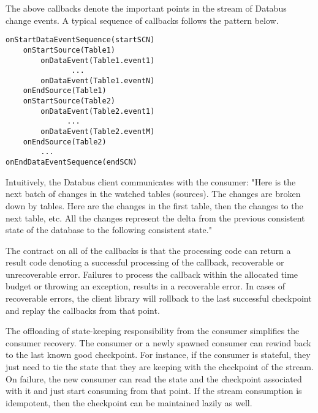 The above callbacks denote the important points in the stream of Databus change events. A typical sequence of callbacks follows the pattern below.

\begin{verbatim}
onStartDataEventSequence(startSCN)
    onStartSource(Table1)
        onDataEvent(Table1.event1)
               ...
        onDataEvent(Table1.eventN) 
    onEndSource(Table1)
    onStartSource(Table2)
        onDataEvent(Table2.event1) 
              ...
        onDataEvent(Table2.eventM)
    onEndSource(Table2)
        ... 
onEndDataEventSequence(endSCN)
\end{verbatim}

Intuitively, the Databus client communicates with the consumer: "Here is the next batch of changes in the watched tables (sources). The changes are broken down by tables. Here are the changes in the first table, then the changes to the next table, etc. All the changes represent the delta from the previous consistent state of the database to the following consistent state."

The contract on all of the callbacks is that the processing code can return a result code denoting a successful processing of the callback, recoverable or unrecoverable error. Failures to process the callback within the allocated time budget or throwing an exception, results in a recoverable error.
In cases of recoverable errors, the client library will rollback to the last successful checkpoint and replay the callbacks from that point.

The offloading of state-keeping responsibility from the consumer simplifies the consumer recovery. The consumer or a newly spawned consumer can rewind back to the last known good checkpoint. For instance, if the consumer is stateful, they just need to tie the state that they are keeping with the checkpoint of the stream. On failure, the new consumer can read the state and the checkpoint associated with it and just start consuming from that point. If the stream consumption is idempotent, then the checkpoint can be maintained lazily as well. 


